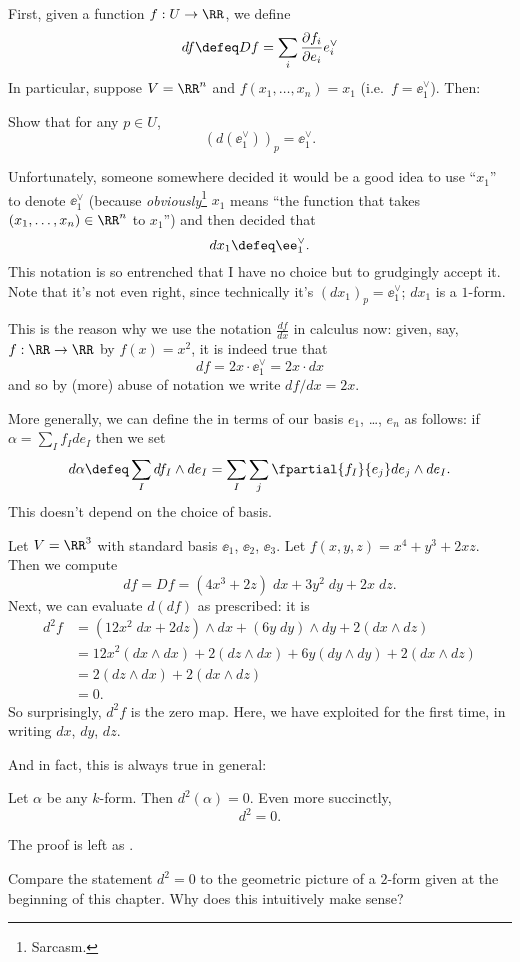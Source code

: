 First, given a function $f : U \to \RR$,
we define
\[ df \defeq Df = \sum_i \frac{\partial f_i}{\partial e_i} e_i^\vee \]
In particular, suppose $V = \RR^n$ and $f(x_1, \dots, x_n) = x_1$
(i.e.\ $f = \ee_1^\vee$). Then:
\begin{ques}
	Show that for any $p \in U$, \[ \left( d(\ee_1^\vee) \right)_p = \ee_1^\vee. \]
\end{ques}

\begin{abuse}
	Unfortunately, someone somewhere decided
	it would be a good idea to use ``$x_1$'' to denote $\ee_1^\vee$
	(because \emph{obviously}\footnote{Sarcasm.} $x_1$ means
	``the function that takes $(x_1, \dots, x_n) \in \RR^n$ to $x_1$'')
	and then decided that \[ dx_1 \defeq \ee_1^\vee. \]
	This notation is so entrenched that I have no choice
	but to grudgingly accept it.
	Note that it's not even right,
	since technically it's $(dx_1)_p = \ee_1^\vee$; $dx_1$ is a $1$-form.
	\label{abuse:dx}
\end{abuse}
\begin{remark}
	This is the reason why we use the notation $\frac{df}{dx}$ in calculus now:
	given, say, $f : \RR \to \RR$ by $f(x) = x^2$, it is indeed true that
	\[ df = 2x \cdot \ee_1^\vee = 2x \cdot dx \]
	and so by (more) abuse of notation we write $df/dx = 2x$.
\end{remark}

More generally, we can define the 
in terms of our basis $e_1$, \dots, $e_n$ as follows:
if $\alpha = \sum_I f_I de_I$ then we set
\[ d\alpha \defeq \sum_I df_I \wedge de_I
	= \sum_I \sum_j \fpartial{f_I}{e_j} de_j \wedge de_I. \]
This doesn't depend on the choice of basis.

\begin{example}
	Let $V = \RR^3$ with standard basis $\ee_1$, $\ee_2$, $\ee_3$.
	Let $f(x,y,z) = x^4 + y^3 + 2xz$.
	Then we compute
	\[ df = Df = (4x^3+2z) \; dx + 3y^2 \; dy + 2x \; dz. \]
	Next, we can evaluate $d(df)$ as prescribed: it is
	\begin{align*}
		d^2f &= (12x^2 \; dx + 2 dz) \wedge dx + (6y \; dy) \wedge dy
		+ 2(dx \wedge dz) \\
		&= 12x^2 (dx \wedge dx) + 2(dz \wedge dx) + 6y (dy \wedge dy) + 2(dx \wedge dz) \\
		&= 2(dz \wedge dx) + 2(dx \wedge dz) \\
		&= 0.
	\end{align*}
	So surprisingly, $d^2f$ is the zero map.
	Here, we have exploited  for the first time,
	in writing $dx$, $dy$, $dz$.
\end{example}
And in fact, this is always true in general:
\begin{theorem}
	\label{thm:dd_zero}
	Let $\alpha$ be any $k$-form.
	Then $d^2(\alpha) = 0$.
	Even more succinctly, \[ d^2 = 0. \]
\end{theorem}
The proof is left as .
\begin{exercise}
	Compare the statement $d^2 = 0$ to the geometric
	picture of a $2$-form given at the beginning of this chapter.
	Why does this intuitively make sense?
\end{exercise}

